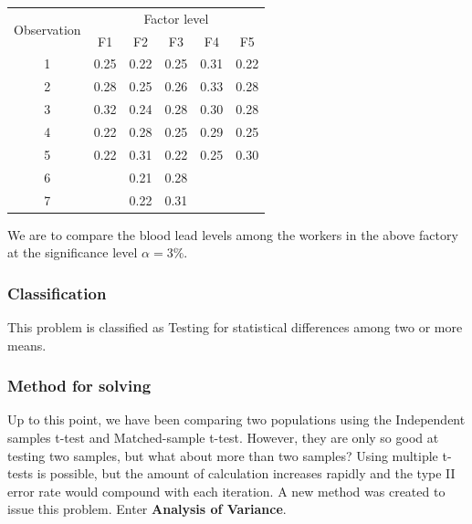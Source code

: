 \documentclass[a4paper]{article}
\numberwithin{equation}{section}
\begin{document}
\begin{center}
  \begin{tabular}{cccccc}
    \toprule
    \multirow{2}{*}{Observation} & \multicolumn{5}{c}{Factor level}                             \\
    \cmidrule(lr){2-6}
                                 & F1                               & F2   & F3   & F4   & F5   \\
    \midrule
    1                            & 0.25                             & 0.22 & 0.25 & 0.31 & 0.22 \\
    2                            & 0.28                             & 0.25 & 0.26 & 0.33 & 0.28 \\
    3                            & 0.32                             & 0.24 & 0.28 & 0.30 & 0.28 \\
    4                            & 0.22                             & 0.28 & 0.25 & 0.29 & 0.25 \\
    5                            & 0.22                             & 0.31 & 0.22 & 0.25 & 0.30 \\
    6                            &                                  & 0.21 & 0.28 &      &      \\
    7                            &                                  & 0.22 & 0.31 &      &      \\
    \bottomrule
  \end{tabular}
\end{center}

We are to compare the blood lead levels among the workers in the above factory at the significance level \( \alpha = 3\% \).

\subsubsection{Classification}
This problem is classified as Testing for statistical differences among two or more means.

\subsubsection{Method for solving}
Up to this point, we have been comparing two populations using the Independent samples t-test and Matched-sample t-test.
However, they are only so good at testing two samples, but what about more than two samples?
Using multiple t-tests is possible, but the amount of calculation increases rapidly and the type II error rate would compound with each iteration.
A new method was created to issue this problem.
Enter \textbf{Analysis of Variance}.
\end{document}
